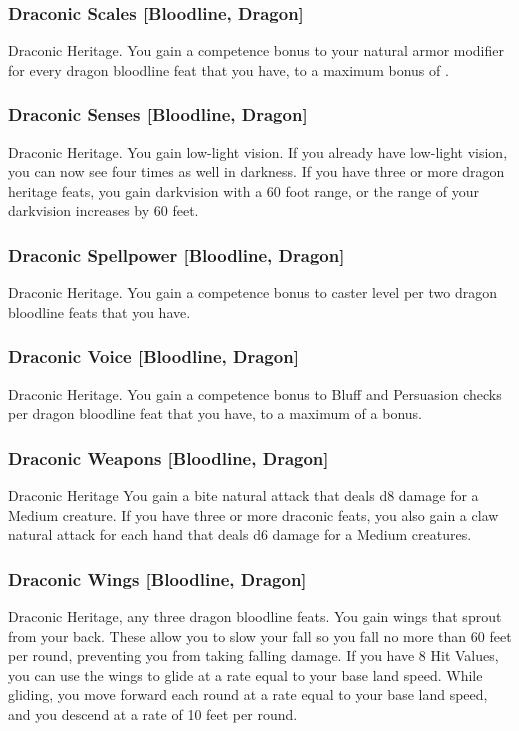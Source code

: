 \subsubsection{Draconic Scales [Bloodline, Dragon]}
 Draconic Heritage.
 You gain a  competence bonus to your natural armor modifier for every dragon bloodline feat that you have, to a maximum bonus of .

\subsubsection{Draconic Senses [Bloodline, Dragon]}
 Draconic Heritage.
 You gain low-light vision. If you already have low-light vision, you can now see four times as well in darkness. If you have three or more dragon heritage feats, you gain darkvision with a 60 foot range, or the range of your darkvision increases by 60 feet.

\subsubsection{Draconic Spellpower [Bloodline, Dragon]}
 Draconic Heritage.
 You gain a  competence bonus to caster level per two dragon bloodline feats that you have.

\subsubsection{Draconic Voice [Bloodline, Dragon]}
 Draconic Heritage.
 You gain a  competence bonus to Bluff and Persuasion checks per dragon bloodline feat that you have, to a maximum of a  bonus.

\subsubsection{Draconic Weapons [Bloodline, Dragon]}
 Draconic Heritage
 You gain a bite natural attack that deals d8 damage for a Medium creature. If you have three or more draconic feats, you also gain a claw natural attack for each hand that deals d6 damage for a Medium creatures.

\subsubsection{Draconic Wings [Bloodline, Dragon]}
 Draconic Heritage, any three dragon bloodline feats.
 You gain wings that sprout from your back. These allow you to slow your fall so you fall no more than 60 feet per round, preventing you from taking falling damage. If you have 8 Hit Values, you can use the wings to glide at a rate equal to your base land speed. While gliding, you move forward each round at a rate equal to your base land speed, and you descend at a rate of 10 feet per round.


